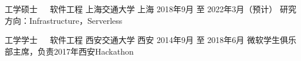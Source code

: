 

\begin{cventries}

  \cventry
    {工学硕士~~~软件工程} %
    {上海交通大学} %
    {上海} %
    {2018年9月 至 2022年3月（预计）} %
    {研究方向：Infrastructure，Serverless}

  \cventry
    {工学学士~~~软件工程} %
    {西安交通大学} %
    {西安} %
    {2014年9月 至 2018年6月} %
    {微软学生俱乐部主席，负责2017年西安Hackathon}

\end{cventries}
